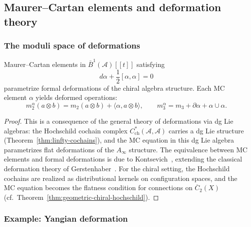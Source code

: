 
\subsection{Maurer--Cartan elements and deformation theory}

\subsubsection{The moduli space of deformations}

\begin{theorem}[Maurer--Cartan = deformations {\cite{Kon03,Ger63}}; \ClaimStatusProvedElsewhere]\label{thm:genus-graded-mc}
Maurer--Cartan elements in $\bar{B}^1(\mathcal{A})[[t]]$ satisfying
\[d\alpha + \frac{1}{2}[\alpha, \alpha] = 0\]
parametrize formal deformations of the chiral algebra structure.
Each MC element $\alpha$ yields deformed operations:
\[m_2^\alpha(a \otimes b) = m_2(a \otimes b) + \langle \alpha, a \otimes b \rangle, \qquad
m_3^\alpha = m_3 + \partial\alpha + \alpha \cup \alpha.\]
\end{theorem}

\begin{proof}
This is a consequence of the general theory of deformations via
dg Lie algebras: the Hochschild cochain complex
$C^*_{\mathrm{ch}}(\mathcal{A}, \mathcal{A})$ carries a dg Lie
structure (Theorem~\ref{thm:linfty-cochains}), and the MC equation
in this dg Lie algebra parametrizes flat deformations of the
$A_\infty$ structure. The equivalence between MC elements and
formal deformations is due to Kontsevich~\cite{Kon03},
extending the classical deformation theory of
Gerstenhaber~\cite{Ger63}. For the chiral setting, the
Hochschild cochains are realized as distributional kernels on
configuration spaces, and the MC equation becomes the flatness
condition for connections on
$\overline{C}_2(X)$ (cf.\ Theorem~\ref{thm:geometric-chiral-hochschild}).
\end{proof}

\subsubsection{Example: Yangian deformation}

